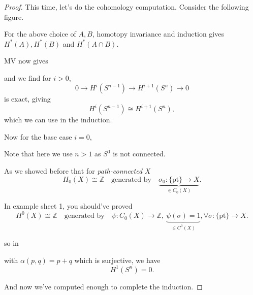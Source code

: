 \documentclass[a4paper,11pt]{article}
\begin{document}
	\begin{proof}
		This time, let's do the cohomology computation. Consider the following figure.


		For the above choice of $A,B$, homotopy invariance and induction gives $H^*(A), H^*(B)$ and $H^*(A\cap B)$. 

		MV now gives
		\begin{center}
		\end{center}
		and we find for $i > 0$, 
		\[
			0 \to H^i (S ^{n-1}) \to H ^{i+1} (S^n) \to 0
		\]
		is exact, giving
		\[
			H^i(S ^{n-1}) \cong H ^{i+1}(S^n),
		\]
		which we can use in the induction.

		Now for the base case $i = 0$,
		\begin{center}
		\end{center}
		Note that here we use $n > 1$ as $S^0$ is not connected. 

		As we showed before that for \emph{path-connected} $X$
		\[
			H_0(X) \cong \mathbb{Z} \quad \text{generated by} \quad \underbrace{\sigma_0 : \{\text{pt}\} \to X}_{\in C_0(X)}. 
		\]
		
		In example sheet 1, you should've proved
		\[
			H^0 (X) \cong \mathbb{Z} \quad \text{generated by} \quad \psi : C_0(X) \to \mathbb{Z},\  \underbrace{\psi(\sigma) = 1}_{\in C^0(X)}, \forall \sigma : \{\text{pt}\} \to X.
		\]
		
		so in
		\begin{center}
		\end{center}
		with $\alpha(p,q) = p + q$ which is surjective, we have
		\[
			H^1(S^n) = 0.
		\]
		
		And now we've computed enough to complete the induction.
	\end{proof}
\end{document}
